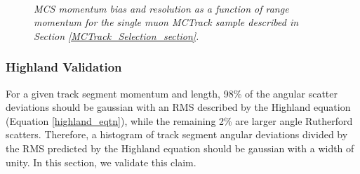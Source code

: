\begin{figure}
\centering
\mbox{
	\quad
	}
\caption{\textit{MCS momentum bias and resolution as a function of range momentum for the single muon {\sc MCTrack} sample described in Section \ref{MCTrack_Selection_section}.}}
\label{MCS_range_bias_resolution_MCTrack_fig}
\end{figure}



\subsubsection{Highland Validation}\label{Highland_Validation_MCTrack_section}
For a given track segment momentum and length, 98\% of the angular scatter deviations should be gaussian with an RMS described by the Highland equation (Equation \ref{highland_eqtn}), while the remaining 2\% are larger angle Rutherford scatters\cite{highland}. Therefore, a histogram of track segment angular deviations divided by the RMS predicted by the Highland equation should be gaussian with a width of unity. In this section, we validate this claim.\\

